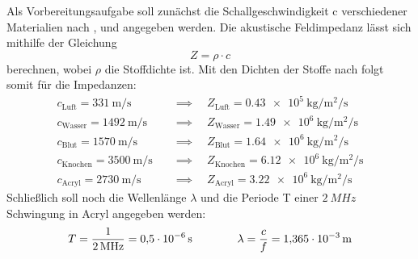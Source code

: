 Als Vorbereitungsaufgabe soll zunächst die Schallgeschwindigkeit c verschiedener Materialien nach \cite{schallgeschw}, \cite{schallgeschw2} und \cite{schallgeschw3} angegeben werden.
Die akustische Feldimpedanz lässt sich mithilfe der Gleichung
\begin{equation*}
    Z = \rho \cdot c
\end{equation*}
berechnen, wobei $\rho$ die Stoffdichte ist. Mit den Dichten der Stoffe nach \cite{akimpedanz} folgt somit für die Impedanzen:
\begin{align*}
    c_\text{Luft}           =  \qty{331}{\meter\per\second} \quad &\implies \quad Z_\text{Luft}           = \qty{0.43e5}{\kilo\gram\per\meter\squared\per\second} \\
    c_\text{Wasser}         = \qty{1492}{\meter\per\second} \quad &\implies \quad Z_\text{Wasser}         = \qty{1.49e6}{\kilo\gram\per\meter\squared\per\second} \\
    c_\text{Blut}           = \qty{1570}{\meter\per\second} \quad &\implies \quad Z_\text{Blut}           = \qty{1.64e6}{\kilo\gram\per\meter\squared\per\second} \\
    c_\text{Knochen}        = \qty{3500}{\meter\per\second} \quad &\implies \quad Z_\text{Knochen}        = \qty{6.12e6}{\kilo\gram\per\meter\squared\per\second} \\
    c_\text{Acryl}          = \qty{2730}{\meter\per\second} \quad &\implies \quad Z_\text{Acryl}          = \qty{3.22e6}{\kilo\gram\per\meter\squared\per\second} 
\end{align*}
Schließlich soll noch die Wellenlänge $\lambda$ und die Periode T einer $\qty{2}{MHz}$ Schwingung in Acryl angegeben werden:
\begin{align*}
    T = \frac{1}{\qty{2}{MHz}} = \qty{0.5e{-6}}{\second} \qquad \qquad \lambda = \frac{c}{f} = \qty{1.365e{-3}}{m}
\end{align*}